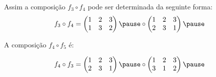 \documentclass{beamer}
\begin{document}
    \begin{frame}
        Assim a composição $f_3 \circ f_4$ pode ser determinada da seguinte forma:
        \[
            f_3\circ f_4 = \begin{pmatrix}
                    1 & 2 & 3\\
                    1 & 3 & 2
                \end{pmatrix} \pause \circ \begin{pmatrix}
                    1 & 2 & 3\\
                    2 & 3 & 1
                \end{pmatrix} \pause
        \]
    \end{frame}

    \begin{frame}
        A composição $f_4 \circ f_5$ é:

        \[
            f_4\circ f_3 = \begin{pmatrix}
                    1 & 2 & 3\\
                    2 & 3 & 1
                \end{pmatrix} \pause \circ \begin{pmatrix}
                    1 & 2 & 3\\
                    3 & 1 & 2
                \end{pmatrix} \pause
        \]
    \end{frame}
\end{document}
